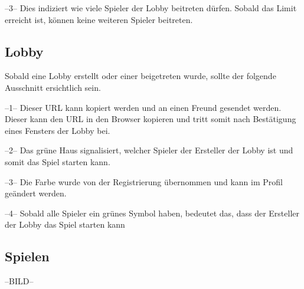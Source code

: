 \documentclass[11pt,ngerman]{article}
\begin{document}
    --3-- Dies indiziert wie viele Spieler der Lobby beitreten dürfen. Sobald das Limit erreicht ist, können keine weiteren Spieler beitreten.
    
	\subsection{Lobby}
	
	Sobald eine Lobby erstellt oder einer beigetreten wurde, sollte der folgende Ausschnitt ersichtlich sein.
    
    
    --1-- Dieser URL kann kopiert werden und an einen Freund gesendet werden. Dieser kann den URL in den Browser kopieren und tritt somit nach Bestätigung eines Fensters der Lobby bei.
    
    --2-- Das grüne Haus signalisiert, welcher Spieler der Ersteller der Lobby ist und somit das Spiel starten kann.
    
    --3-- Die Farbe wurde von der Registrierung übernommen und kann im Profil geändert werden.
    
    --4-- Sobald alle Spieler ein grünes Symbol haben, bedeutet das, dass der Ersteller der Lobby das Spiel starten kann
    
    \subsection{Spielen}
    
    --BILD--
    
    
\end{document}
